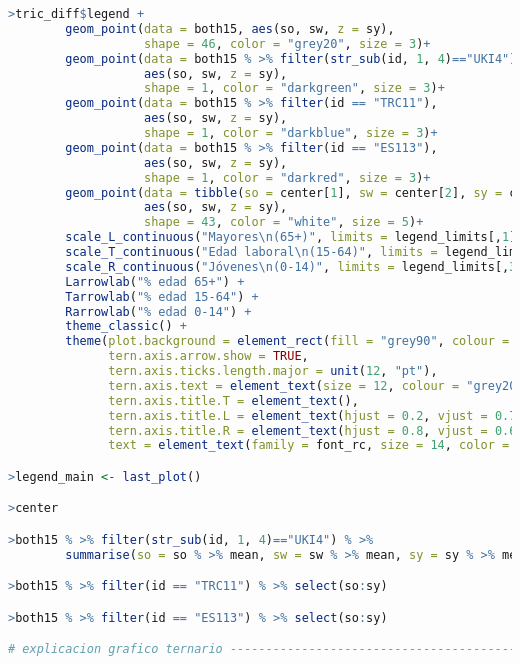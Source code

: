 \begin{lstlisting}[language=R, caption=C\'odigo 2 con la construcci\'on del mapa]
>tric_diff$legend +
        geom_point(data = both15, aes(so, sw, z = sy), 
                   shape = 46, color = "grey20", size = 3)+
        geom_point(data = both15 % >% filter(str_sub(id, 1, 4)=="UKI4"), 
                   aes(so, sw, z = sy), 
                   shape = 1, color = "darkgreen", size = 3)+
        geom_point(data = both15 % >% filter(id == "TRC11"), 
                   aes(so, sw, z = sy), 
                   shape = 1, color = "darkblue", size = 3)+
        geom_point(data = both15 % >% filter(id == "ES113"), 
                   aes(so, sw, z = sy), 
                   shape = 1, color = "darkred", size = 3)+
        geom_point(data = tibble(so = center[1], sw = center[2], sy = center[3]), 
                   aes(so, sw, z = sy), 
                   shape = 43, color = "white", size = 5)+
        scale_L_continuous("Mayores\n(65+)", limits = legend_limits[,1]) +
        scale_T_continuous("Edad laboral\n(15-64)", limits = legend_limits[,2]) +
        scale_R_continuous("Jóvenes\n(0-14)", limits = legend_limits[,3]) +
        Larrowlab("% edad 65+") +
        Tarrowlab("% edad 15-64") +
        Rarrowlab("% edad 0-14") +
        theme_classic() +
        theme(plot.background = element_rect(fill = "grey90", colour = NA),
              tern.axis.arrow.show = TRUE, 
              tern.axis.ticks.length.major = unit(12, "pt"),
              tern.axis.text = element_text(size = 12, colour = "grey20"),
              tern.axis.title.T = element_text(),
              tern.axis.title.L = element_text(hjust = 0.2, vjust = 0.7, angle = -60),
              tern.axis.title.R = element_text(hjust = 0.8, vjust = 0.6, angle = 60),
              text = element_text(family = font_rc, size = 14, color = "grey20"))

>legend_main <- last_plot()

>center

>both15 % >% filter(str_sub(id, 1, 4)=="UKI4") % >% 
        summarise(so = so % >% mean, sw = sw % >% mean, sy = sy % >% mean)

>both15 % >% filter(id == "TRC11") % >% select(so:sy)

>both15 % >% filter(id == "ES113") % >% select(so:sy)

# explicacion grafico ternario ------------------------------------------------


\end{lstlisting}
